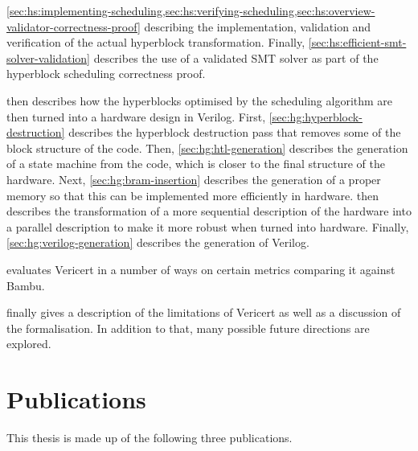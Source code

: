 \begin{description}
  \cref{sec:hs:implementing-scheduling,sec:hs:verifying-scheduling,sec:hs:overview-validator-correctness-proof}
  describing the implementation, validation and verification of the actual
  hyperblock transformation.  Finally,
  \cref{sec:hs:efficient-smt-solver-validation} describes the use of a validated
  SMT solver as part of the hyperblock scheduling correctness proof.
\item[\Cref{sec:hardware-generation}] then describes how the hyperblocks
  optimised by the scheduling algorithm are then turned into a hardware design
  in Verilog.  First, \cref{sec:hg:hyperblock-destruction} describes the
  hyperblock destruction pass that removes some of the block structure of the
  code.  Then, \cref{sec:hg:htl-generation} describes the generation of a state
  machine from the code, which is closer to the final structure of the hardware.
  Next, \cref{sec:hg:bram-insertion} describes the generation of a proper memory
  so that this can be implemented more efficiently in hardware.
   then describes the transformation
  of a more sequential description of the hardware into a parallel description
  to make it more robust when turned into hardware.  Finally,
  \cref{sec:hg:verilog-generation} describes the generation of Verilog.
\item[\Cref{sec:evaluation}] evaluates Vericert in a number of ways on certain
  metrics comparing it against Bambu.
\item[\Cref{sec:conclusion}] finally gives a description of the limitations of
  Vericert as well as a discussion of the formalisation.  In addition to that,
  many possible future directions are explored.
\end{description}

\section{Publications}

This thesis is made up of the following three publications.

